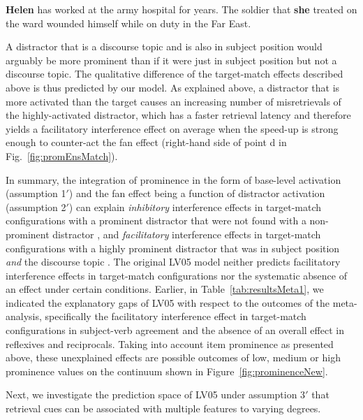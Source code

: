 \documentclass{cambridge7A}\usepackage[]{graphicx}\usepackage[]{color}
\begin{document}
\begin{exe} 
\ex\label{ex:cf13:ex2baseline}
\textbf{Helen} has worked at the army hospital for years. The soldier that \textbf{she} treated on the ward wounded himself while on duty in the Far East.
\end{exe}

A distractor that is a discourse topic and is also in subject position would arguably be more prominent than if it were just in subject position but not a discourse topic. The qualitative difference of the target-match effects described above is thus predicted by our model. As explained above, a distractor that is more activated than the target causes an increasing number of misretrievals of the highly-activated distractor, which has a faster retrieval latency and therefore yields a facilitatory interference effect on average when the speed-up is strong enough to counter-act the fan effect (right-hand side of point d in Fig.~\ref{fig:promEnsMatch}).

In summary, the integration of prominence in the form of base-level  activation (assumption 1$'$) and the fan effect being a function of distractor activation (assumption 2$'$) can explain \emph{inhibitory} interference effects in target-match configurations with a prominent distractor that were not found with a non-prominent distractor \citep{VanDykeMcElree2011,PatilVasishthLewis2016,JaegerEngelmannVasishth2015}, and \emph{facilitatory} interference effects in target-match configurations with a highly prominent distractor that was in subject position \emph{and} the discourse topic \citep{CunningsFelser2013,Sturt2003}.
The original LV05 model neither predicts facilitatory interference effects in target-match configurations nor the systematic absence of an effect under certain conditions.
Earlier, in Table~\ref{tab:resultsMeta1}, we indicated the explanatory gaps of LV05 with respect to the outcomes of the \cite{JaegerEngelmannVasishth2017} meta-analysis, specifically the facilitatory interference effect in target-match configurations in subject-verb agreement and the absence of an overall effect in reflexives and reciprocals. 
Taking into account item prominence as presented above, these unexplained effects are possible outcomes of low, medium or high prominence values on the continuum shown in Figure~\ref{fig:prominenceNew}.

Next, we investigate the prediction space of LV05 under assumption 3$'$ that retrieval cues can be associated with multiple features to varying degrees.
\end{document}
